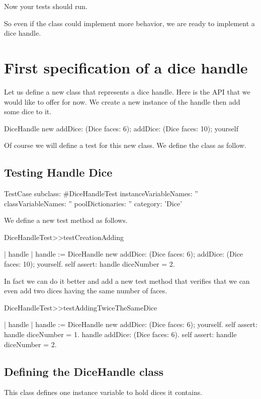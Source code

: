 \documentclass[a4paper,10pt,twoside]{book}
\begin{document}
Now your tests should run. 

So even if the class  could implement more behavior, we are ready to implement a dice handle. 
\section{ First specification of a dice handle}
Let us define a new class  that represents a dice handle. 
Here is the API that we would like to offer for now. We create a new instance of the handle then add some dice to it.


\begin{code}{}
DiceHandle new 
	addDice: (Dice faces: 6);
	addDice: (Dice faces: 10);
	yourself
\end{code}


Of course we will define a test for this new class. We define the class  as follow. 
\subsection{ Testing Handle Dice}

\begin{code}{}
TestCase subclass: #DiceHandleTest
	instanceVariableNames: ''
	classVariableNames: ''
	poolDictionaries: ''
	category: 'Dice'
\end{code}


We define a new test method as follows. 


\begin{code}{}
DiceHandleTest>>testCreationAdding

	| handle |
	handle := DiceHandle new 
			addDice: (Dice faces: 6);
			addDice: (Dice faces: 10);
			yourself.
	self assert: handle diceNumber = 2.
\end{code}


In fact we can do it better and add a new test method that verifies that we can even add
two dices having the same number of faces. 


\begin{code}{}
DiceHandleTest>>testAddingTwiceTheSameDice

	| handle |
	handle := DiceHandle new 
			addDice: (Dice faces: 6);
			yourself.
	self assert: handle diceNumber = 1.
	handle addDice: (Dice faces: 6).
	self assert: handle diceNumber = 2.
\end{code}

\subsection{ Defining the DiceHandle class}
This class defines one instance variable to hold dices it contains. 
\end{document}
